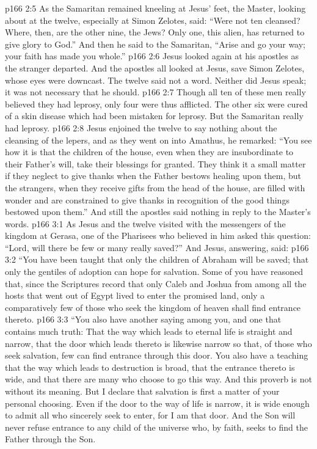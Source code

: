 \vs p166 2:5 As the Samaritan remained kneeling at Jesus’ feet, the Master, looking about at the twelve, especially at Simon Zelotes, said: \textcolor{ubdarkred}{“Were not ten cleansed? Where, then, are the other nine, the Jews? Only one, this alien, has returned to give glory to God.”} And then he said to the Samaritan, \textcolor{ubdarkred}{“Arise and go your way; your faith has made you whole.”}
\vs p166 2:6 Jesus looked again at his apostles as the stranger departed. And the apostles all looked at Jesus, save Simon Zelotes, whose eyes were downcast. The twelve said not a word. Neither did Jesus speak; it was not necessary that he should.
\pc \vs p166 2:7 Though all ten of these men really believed they had leprosy, only four were thus afflicted. The other six were cured of a skin disease which had been mistaken for leprosy. But the Samaritan really had leprosy.
\pc \vs p166 2:8 Jesus enjoined the twelve to say nothing about the cleansing of the lepers, and as they went on into Amathus, he remarked: \textcolor{ubdarkred}{“You see how it is that the children of the house, even when they are insubordinate to their Father’s will, take their blessings for granted. They think it a small matter if they neglect to give thanks when the Father bestows healing upon them, but the strangers, when they receive gifts from the head of the house, are filled with wonder and are constrained to give thanks in recognition of the good things bestowed upon them.”} And still the apostles said nothing in reply to the Master’s words.\plusone
{}
\vs p166 3:1 As Jesus and the twelve visited with the messengers of the kingdom at Gerasa, one of the Pharisees who believed in him asked this question: “Lord, will there be few or many really saved?” And Jesus, answering, said:
\pc \vs p166 3:2 \textcolor{ubdarkred}{“You have been taught that only the children of Abraham will be saved; that only the gentiles of adoption can hope for salvation. Some of you have reasoned that, since the Scriptures record that only Caleb and Joshua from among all the hosts that went out of Egypt lived to enter the promised land, only a comparatively few of those who seek the kingdom of heaven shall find entrance thereto.}
\vs p166 3:3 \textcolor{ubdarkred}{“You also have another saying among you, and one that contains much truth: That the way which leads to eternal life is straight and narrow, that the door which leads thereto is likewise narrow so that, of those who seek salvation, few can find entrance through this door. You also have a teaching that the way which leads to destruction is broad, that the entrance thereto is wide, and that there are many who choose to go this way. And this proverb is not without its meaning. But I declare that salvation is first a matter of your personal choosing. Even if the door to the way of life is narrow, it is wide enough to admit all who sincerely seek to enter, for I am that door. And the Son will never refuse entrance to any child of the universe who, by faith, seeks to find the Father through the Son.}
